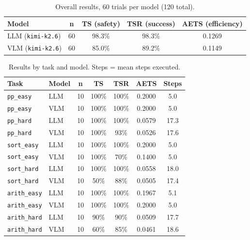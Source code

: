 \begin{table}[H]
\centering
\caption{Overall results, 60 trials per model (120 total).}
\label{tab:bench-overall}
\begin{tabular}{@{}lcccc@{}}
\toprule
\textbf{Model} & \textbf{n} & \textbf{TS (safety)} & \textbf{TSR (success)} & \textbf{AETS (efficiency)} \\
\midrule
LLM (\texttt{kimi-k2.6}) & 60 & 98.3\% & 98.3\% & 0.1269 \\
VLM (\texttt{kimi-k2.6}) & 60 & 85.0\% & 89.2\% & 0.1149 \\
\bottomrule
\end{tabular}
\end{table}

\begin{table}[H]
\centering
\caption{Results by task and model. Steps = mean steps executed.}
\label{tab:bench-by-task}
\begin{tabular}{@{}llccccc@{}}
\toprule
\textbf{Task} & \textbf{Model} & \textbf{n} & \textbf{TS} & \textbf{TSR} & \textbf{AETS} & \textbf{Steps} \\
\midrule
\texttt{pp\_easy}    & LLM & 10 & 100\% & 100\% & 0.2000 & 5.0 \\
\texttt{pp\_easy}    & VLM & 10 & 100\% & 100\% & 0.2000 & 5.0 \\
\texttt{pp\_hard}    & LLM & 10 & 100\% & 100\% & 0.0579 & 17.3 \\
\texttt{pp\_hard}    & VLM & 10 & 100\% &  93\% & 0.0526 & 17.6 \\
\texttt{sort\_easy}  & LLM & 10 & 100\% & 100\% & 0.2000 & 5.0 \\
\texttt{sort\_easy}  & VLM & 10 & 100\% &  70\% & 0.1400 & 5.0 \\
\texttt{sort\_hard}  & LLM & 10 & 100\% & 100\% & 0.0558 & 18.0 \\
\texttt{sort\_hard}  & VLM & 10 &  50\% &  88\% & 0.0505 & 17.4 \\
\texttt{arith\_easy} & LLM & 10 & 100\% & 100\% & 0.1967 & 5.1 \\
\texttt{arith\_easy} & VLM & 10 & 100\% & 100\% & 0.2000 & 5.0 \\
\texttt{arith\_hard} & LLM & 10 &  90\% &  90\% & 0.0509 & 17.7 \\
\texttt{arith\_hard} & VLM & 10 &  60\% &  85\% & 0.0461 & 18.6 \\
\bottomrule
\end{tabular}
\end{table}

